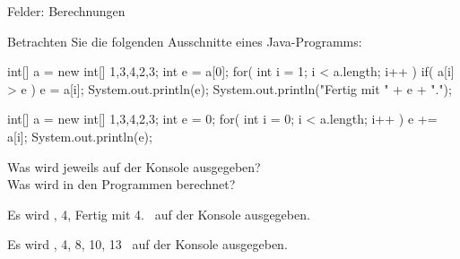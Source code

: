 \begin{exercise}{Felder: Berechnungen}
\begin{body}
Betrachten Sie die folgenden Ausschnitte eines Java-Programms:

\begin{parts}
\item 
\begin{displaycode}
    int[] a = new  int[] {1,3,4,2,3};
    int  e = a[0];
    for( int i = 1; i < a.length; i++ ) {
      if( a[i] > e ) {
        e = a[i];
	System.out.println(e);
      }
    }
    System.out.println("Fertig mit " + e + ".");
\end{displaycode}

\item
\begin{displaycode}
    int[] a = new  int[] {1,3,4,2,3};
    int  e = 0;
    for( int i = 0; i < a.length; i++ ) {
      e += a[i];
      System.out.println(e);
    }
\end{displaycode}
\end{parts}
Was wird jeweils auf der Konsole ausgegeben?\\
Was wird in den Programmen berechnet?
\end{body}


\begin{solution}
\begin{parts}
\item
Es wird , 4, Fertig mit 4. \grqq\ auf der Konsole ausgegeben.

\item
Es wird , 4, 8, 10, 13 \grqq\ auf der Konsole ausgegeben.
\end{parts}
\end{solution}
\end{exercise}